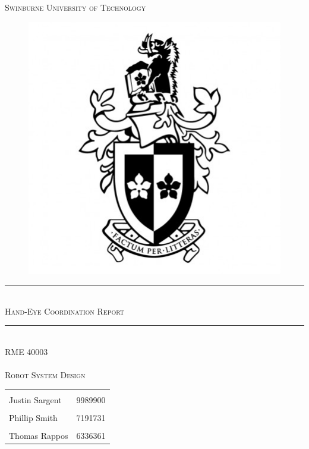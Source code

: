 \documentclass[11pt,a4paper, margin=1in]{report}
\begin{document}
\begin{titlepage}
	\begin{center}
		\vspace*{-.5cm}
		\textsc{\LARGE Swinburne University of Technology}\\
		
		\begin{figure}[h]
			\centering
			\includegraphics[width=0.5\linewidth]{swinburne_university_of_technology_111401}
		\end{figure}
		\vspace*{2cm}
		\hrule \  \\[0.4cm]
		\textsc{\Huge Hand-Eye Coordination Report}\\[0.5cm]
		\hrule \  \\[0.4cm]
		\textsc{\Large{RME 40003}\\ \  \\[0.1cm]
			\huge Robot System Design}\\[1cm]
		
		\normalsize
		\begin{tabular}{l r}
			\hline\\ Justin Sargent & 9989900 \\[0.25cm]
			\\ Phillip Smith & 7191731 \\ [0.25cm]
			\\ Thomas Rappos & 6336361 \\[0.25cm]
			\hline 
		\end{tabular} 
	\end{center}
\end{titlepage}
\tableofcontents
\end{document}
